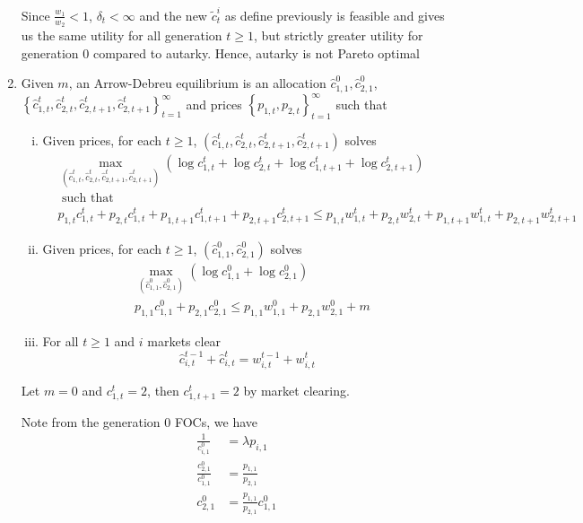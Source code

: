 \documentclass[12pt]{article}
\theoremstyle{definition}
\newcommand\st{\text{ such that }}
\newcommand{\cbra}[1]{\left\{#1\right\}}
\begin{document}
\begin{enumerate}[(1)]
Since $\frac{w_1}{w_2}<1$, $\delta_t<\infty$ and the new $\tilde{c}^i_t$ as define previously is feasible and gives us the same utility for all generation $t\geq 1$, but strictly greater utility for generation $0$ compared to autarky. Hence, autarky is not Pareto optimal

\item


Given $m$, an Arrow-Debreu equilibrium is an allocation $\hat{c}_{1,1}^0,\hat{c}_{2,1}^0$, $\cbra{\hat{c}_{1,t}^t,\hat{c}_{2,t}^t, \hat{c}_{2,t+1}^t, \hat{c}_{2,t+1}^t}_{t=1}^\infty$ and prices $\cbra{p_{1,t},p_{2,t}}_{t=1}^\infty$ such that

\begin{enumerate}[(i)]
	\item Given prices, for each $t\geq 1$, $(\hat{c}_{1,t}^t,\hat{c}_{2,t}^t, \hat{c}_{2,t+1}^t, \hat{c}_{2,t+1}^t)$ solves
	\begin{align*}
	& \max_{(\hat{c}_{1,t}^t,\hat{c}_{2,t}^t, \hat{c}_{2,t+1}^t, \hat{c}_{2,t+1}^t)} (\log{c}_{1,t}^t+\log{c}_{2,t}^t+ \log{c}_{1,t+1}^t+ \log{c}_{2,t+1}^t)\\
	& \st \\
 &p_{1,t}{c}_{1,t}^t +p_{2,t}{c}_{1,t}^t +p_{1,t+1}{c}_{1,t+1}^t  +p_{2,t+1}{c}_{2,t+1}^t \leq p_{1,t}w_{1,t}^t +p_{2,t}w_{2,t}^t  +p_{1,t+1}w_{1,t}^t+p_{2,t+1}w_{2,t+1}^t
	\end{align*}
	
	\item Given prices, for each $t\geq 1$, $(\hat{c}_{1,1}^0,\hat{c}_{2,1}^0)$ solves
	\begin{align*}
	& \max_{(\hat{c}_{1,1}^0,\hat{c}_{2,1}^0)} (\log{c}_{1,1}^0+\log{c}_{2,1}^0)\\
	& p_{1,1}{c}_{1,1}^0 +p_{2,1}{c}_{2,1}^0 \leq p_{1,1}w_{1,1}^0 +p_{2,1}w_{2,1}^0 +m
	\end{align*}
	
	\item For all $t\geq 1$ and $i$ markets clear
	\[
	\hat{c}_{i,t}^{t-1}+ \hat{c}_{i,t}^t = w_{i,t}^{t-1}+w_{i,t}^t
	\]
\end{enumerate}

Let $m=0$ and $c_{1,t}^t=2$, then $c_{1,t+1}^t=2$ by market clearing.

Note from the generation $0$ FOCs, we have
\begin{align*}
	\frac{1}{c_{i,1}^0} &= \lambda p_{i,1}\\
	\frac{c_{2,1}^0}{c_{1,1}^0} &= \frac{p_{1,1}}{p_{2,1}}\\
 	c_{2,1}^0&= \frac{p_{1,1}}{p_{2,1}}c_{1,1}^0
\end{align*}


\end{enumerate}
\end{document}
